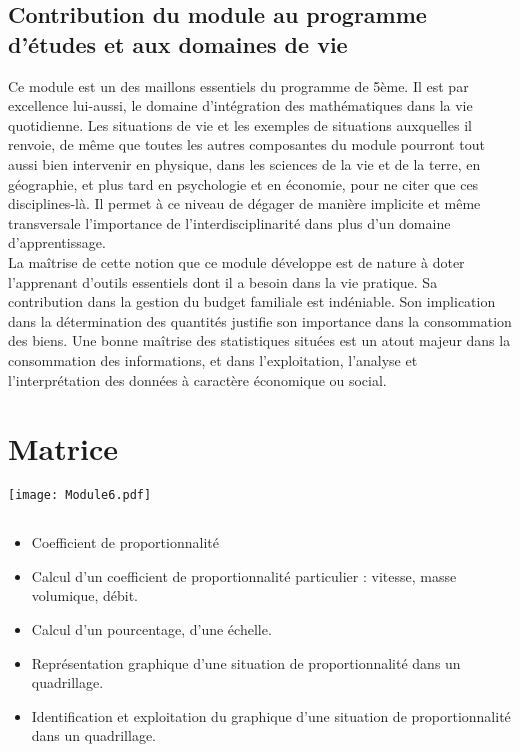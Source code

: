 \subsection{Contribution du module au programme d'études et aux domaines de vie}
Ce module est un des maillons essentiels du programme de 5ème. Il est par excellence lui-aussi, le domaine d'intégration des mathématiques dans la vie quotidienne. Les situations de vie et les exemples de situations auxquelles il renvoie, de même que toutes les autres composantes du module pourront tout aussi bien
intervenir en physique, dans les sciences de la vie et de la terre, en géographie, et plus tard en psychologie et en économie, pour ne citer que ces disciplines-là. Il permet à ce niveau de dégager de manière implicite et même transversale l'importance de l'interdisciplinarité dans plus d'un domaine d'apprentissage.\\
La maîtrise de cette notion que ce module développe est de nature à doter l'apprenant d'outils essentiels dont il a besoin dans la vie pratique. Sa contribution dans la gestion du budget familiale est indéniable. Son implication dans la détermination des quantités justifie son importance dans la consommation des biens. Une bonne maîtrise des statistiques situées est un atout majeur dans la consommation des informations, et dans l'exploitation, l'analyse et l'interprétation des données à caractère économique ou social.

\section{Matrice}

\texttt{[image: Module6.pdf]} 

\subsection*{}

\savoir
\begin{itemize}
\item Coefficient de proportionnalité
\end{itemize}
\savoirfaire
\begin{itemize}
\item Calcul d'un coefficient de proportionnalité particulier : vitesse, masse volumique, débit.
\item Calcul d'un pourcentage, d'une échelle.
\item Représentation graphique d'une situation de proportionnalité dans un quadrillage.
\item Identification et exploitation du graphique d'une situation de proportionnalité dans un quadrillage.
\end{itemize}

